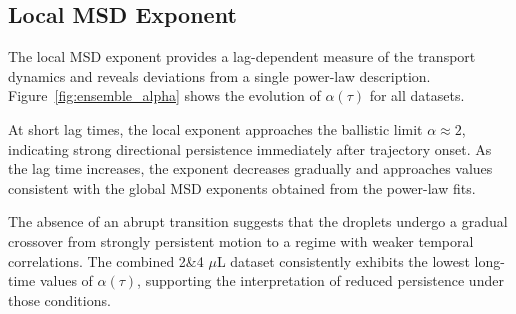 \subsection{Local MSD Exponent}

The local MSD exponent provides a lag-dependent measure of the transport dynamics and reveals deviations from a single power-law description. Figure~\ref{fig:ensemble_alpha} shows the evolution of $\alpha(\tau)$ for all datasets.

At short lag times, the local exponent approaches the ballistic limit $\alpha \approx 2$, indicating strong directional persistence immediately after trajectory onset. As the lag time increases, the exponent decreases gradually and approaches values consistent with the global MSD exponents obtained from the power-law fits.

The absence of an abrupt transition suggests that the droplets undergo a gradual crossover from strongly persistent motion to a regime with weaker temporal correlations. The combined 2\&4 $\mu$L dataset consistently exhibits the lowest long-time values of $\alpha(\tau)$, supporting the interpretation of reduced persistence under those conditions.

